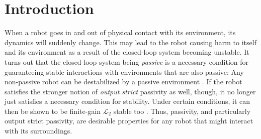 \documentclass[../main.tex]{subfiles}
\begin{document}
    
\section{Introduction} \label{sec:introduction}

When a robot goes in and out of physical contact with its environment, its dynamics will suddenly change. This may lead to the robot causing harm to itself and its environment as a result of the closed-loop system becoming unstable. 
It turns out that the closed-loop system being \textit{passive} is a necessary condition for guaranteeing stable interactions with environments that are also passive: Any non-passive robot can be destabilized by a passive environment \cite{stramigioliEnergyAwareRobotics2015}.
If the robot satisfies the stronger notion of \textit{output strict} passivity as well, though, it no longer just satisfies a necessary condition for stability. 
Under certain conditions, it can then be shown to be finite-gain $\mathcal{L}_2$ stable too \cite[Lem.~6.5]{khalil2002nonlinear}. Thus, passivity, and particularly output strict passivity, are desirable properties for any robot that might interact with its surroundings.
\end{document}
